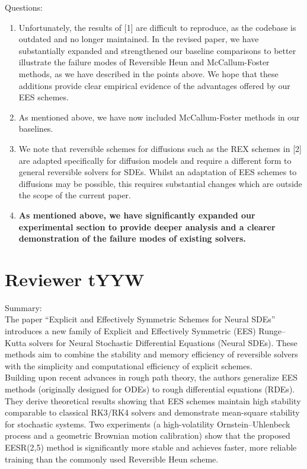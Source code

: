 \documentclass{article}
\newcommand{\NEW}[1]{\color{maroon}\textbf{{#1}}\color{black}}
\begin{document}
Questions:
\begin{enumerate}
    \item Unfortunately, the results of [1] are difficult to reproduce, as the codebase is outdated and no longer maintained. In the revised paper, we have substantially expanded and strengthened our baseline comparisons to better illustrate the failure modes of Reversible Heun and McCallum-Foster methods, as we have described in the points above. We hope that these additions provide clear empirical evidence of the advantages offered by our EES schemes.
    \item As mentioned above, we have now included McCallum-Foster methods in our baselines.
    \item We note that reversible schemes for diffusions such as the REX schemes in [2] are adapted specifically for diffusion models and require a different form to general reversible solvers for SDEs. Whilst an adaptation of EES schemes to diffusions may be possible, this requires substantial changes which are outside the scope of the current paper.
    \item \NEW{As mentioned above, we have significantly expanded our experimental section to provide deeper analysis and a clearer demonstration of the failure modes of existing solvers.}
\end{enumerate}


\section{Reviewer tYYW}

Summary:\\
The paper “Explicit and Effectively Symmetric Schemes for Neural SDEs” introduces a new family of Explicit and Effectively Symmetric (EES) Runge–Kutta solvers for Neural Stochastic Differential Equations (Neural SDEs). These methods aim to combine the stability and memory efficiency of reversible solvers with the simplicity and computational efficiency of explicit schemes.\\

Building upon recent advances in rough path theory, the authors generalize EES methods (originally designed for ODEs) to rough differential equations (RDEs). They derive theoretical results showing that EES schemes maintain high stability comparable to classical RK3/RK4 solvers and demonstrate mean-square stability for stochastic systems. Two experiments (a high-volatility Ornstein–Uhlenbeck process and a geometric Brownian motion calibration) show that the proposed EESR(2,5) method is significantly more stable and achieves faster, more reliable training than the commonly used Reversible Heun scheme.\\
\end{document}
